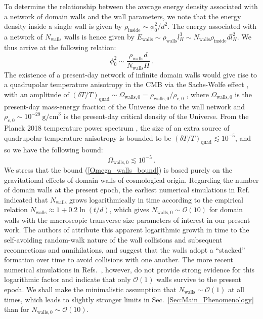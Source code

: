 \documentclass[aps,prd,onecolumn,nofootinbib]{revtex4-2} %
\begin{document}
To determine the relationship between the average energy density associated with a network of domain walls and the wall parameters, we note that the energy density inside a single wall is given by $\rho_\textrm{inside} \sim \phi_0^2/d^2$. 
The energy associated with a network of $N_\textrm{walls}$ walls is hence given by $E_\textrm{walls} \sim \rho_\textrm{walls} l_H^3 \sim N_\textrm{walls} \rho_\textrm{inside} d l_H^2$. 
We thus arrive at the following relation: 
\begin{equation}
\label{DW_amplitude-infinite_network}
\phi_0^2 \sim \frac{\rho_\textrm{walls} d}{N_\textrm{walls} H}  \, . 
\end{equation}
The existence of a present-day network of infinite domain walls would give rise to a quadrupolar temperature anisotropy in the CMB via the Sachs-Wolfe effect \cite{Sachs-Wolfe1967}, with an amplitude of $(\delta T / T)_\textrm{quad} \sim \Omega_{\textrm{walls},0} = \rho_{\textrm{walls},0}/\rho_{c,0}$ \cite{Spergel_1989_walls}, where $\Omega_{\textrm{walls},0}$ is the present-day mass-energy fraction of the Universe due to the wall network and $\rho_{c,0} \sim 10^{-29}~\textrm{g/cm}^{3}$ is the present-day critical density of the Universe. 
From the Planck 2018 temperature power spectrum \cite{Planck2018}, the size of an extra source of quadrupolar temperature anisotropy is bounded to be $(\delta T / T)_\textrm{quad} \lesssim 10^{-5}$, and so we have the following bound: 
\begin{equation}
\label{Omega_walls_bound}
\Omega_{\textrm{walls},0} \lesssim 10^{-5}  \, . 
\end{equation}
We stress that the bound (\ref{Omega_walls_bound}) is based purely on the gravitational effects of domain walls of cosmological origin. 
Regarding the number of domain walls at the present epoch, the earliest numerical simulations in Ref.~\cite{Spergel_1989_walls} indicated that $N_\textrm{walls}$ grows logarithmically in time according to the empirical relation $N_\textrm{walls} \approx 1 + 0.2 \ln(t/d)$, which gives $N_{\textrm{walls},0} \sim \mathcal{O}(10)$ for domain walls with the macroscopic transverse size parameters of interest in our present work. 
The authors of \cite{Spergel_1989_walls} attribute this apparent logarithmic growth in time to the self-avoiding random-walk nature of the wall collisions and subsequent reconnections and annihilations, and suggest that the walls adopt a ``stacked'' formation over time to avoid collisions with one another. 
The more recent numerical simulations in Refs.~\cite{Hindmarsh2003walls,Avelino2004walls,Avelino2005walls}, however, do not provide strong evidence for this logarithmic factor and indicate that only $\mathcal{O}(1)$ walls survive to the present epoch. 
We shall make the minimalistic assumption that $N_{\textrm{walls}} \sim \mathcal{O}(1)$ at all times, which leads to slightly stronger limits in Sec.~\ref{Sec:Main_Phenomenology} than for $N_{\textrm{walls},0} \sim \mathcal{O}(10)$. 
\end{document}
